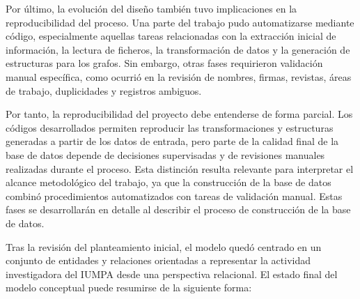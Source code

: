 \documentclass[11pt,spanish,listoffigures,listoftables]{tfgetsinf}
\begin{document}
Por último, la evolución del diseño también tuvo implicaciones en la reproducibilidad del proceso. Una parte del trabajo pudo automatizarse mediante código, especialmente aquellas tareas relacionadas con la extracción inicial de información, la lectura de ficheros, la transformación de datos y la generación de estructuras para los grafos. Sin embargo, otras fases requirieron validación manual específica, como ocurrió en la revisión de nombres, firmas, revistas, áreas de trabajo, duplicidades y registros ambiguos.

Por tanto, la reproducibilidad del proyecto debe entenderse de forma parcial. Los códigos desarrollados permiten reproducir las transformaciones y estructuras generadas a partir de los datos de entrada, pero parte de la calidad final de la base de datos depende de decisiones supervisadas y de revisiones manuales realizadas durante el proceso. Esta distinción resulta relevante para interpretar el alcance metodológico del trabajo, ya que la construcción de la base de datos combinó procedimientos automatizados con tareas de validación manual. Estas fases se desarrollarán en detalle al describir el proceso de construcción de la base de datos.

Tras la revisión del planteamiento inicial, el modelo quedó centrado en un conjunto de entidades y relaciones orientadas a representar la actividad investigadora del IUMPA desde una perspectiva relacional. El estado final del modelo conceptual puede resumirse de la siguiente forma:
\end{document}
